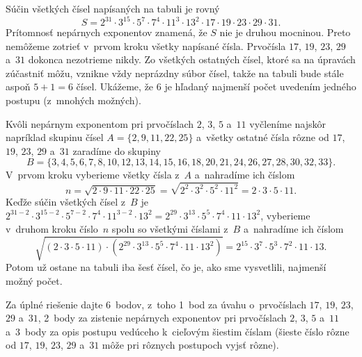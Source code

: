 {%
Súčin všetkých čísel napísaných na tabuli je rovný
$$
S=2^{31}\cdot3^{15}\cdot5^7\cdot7^4\cdot11^3
\cdot13^2\cdot17\cdot19\cdot23\cdot29\cdot31.
$$
Prítomnosť nepárnych exponentov znamená, že $S$ nie je druhou
mocninou. Preto nemôžeme zotrieť v~prvom kroku všetky napísané
čísla. Prvočísla $17$, $19$, $23$, $29$ a~$31$ dokonca nezotrieme nikdy.
Zo všetkých ostatných čísel, ktoré sa na úpravách zúčastniť môžu,
vznikne vždy neprázdny súbor čísel,
takže na tabuli bude stále aspoň $5+1=6$ čísel. Ukážeme, že 6 je
hľadaný najmenší počet uvedením jedného postupu (z~mnohých možných).

Kvôli nepárnym exponentom pri prvočíslach $2$, $3$, $5$ a~$11$ vyčleníme
najskôr napríklad skupinu čísel $A=\{2,9,11,22,25\}$
a~všetky ostatné čísla
rôzne od $17$, $19$, $23$, $29$ a~$31$ zaradíme do skupiny
$$
B=\{3,4,5,6,7,8,10,12,13,14,15,16,18,20,21,24,26,27,28,30,32,33\}.
$$
V~prvom kroku vyberieme všetky čísla z~$A$ a~nahradíme ich číslom
$$
n=\sqrt{2\cdot9\cdot11\cdot22\cdot25}=\sqrt{2^2\cdot3^2\cdot5^2
\cdot11^2}=2\cdot3\cdot5\cdot11.
$$
Keďže súčin všetkých čísel z~$B$ je $2^{31-2}\cdot3^{15-2}
\cdot5^{7-2}\cdot7^4\cdot11^{3-2}\cdot13^2=2^{29}\cdot3^{13}
\cdot5^{5}\cdot7^4\cdot11\cdot13^2$, vyberieme v~druhom kroku
číslo~$n$ spolu so všetkými číslami z~$B$ a~nahradíme ich číslom
$$
\sqrt{(2\cdot3\cdot5\cdot11)
\cdot(2^{29}\cdot3^{13}\cdot5^{5}\cdot7^4\cdot11\cdot13^2)}=
2^{15}\cdot3^7\cdot5^3\cdot7^2\cdot11\cdot13.
$$
Potom už ostane na tabuli iba šesť čísel, čo je, ako sme vysvetlili,
najmenší možný počet.

\nobreak\medskip\petit\noindent
Za úplné riešenie dajte 6~bodov, z~toho 1~bod za úvahu
o~prvočíslach $17$, $19$, $23$, $29$ a~$31$, 2~body za zistenie nepárnych
exponentov pri prvočíslach $2$, $3$, $5$ a~$11$ a~3~body za opis
postupu vedúceho k~cieľovým šiestim číslam (šieste číslo rôzne od
$17$, $19$, $23$, $29$ a~$31$ môže pri rôznych postupoch vyjsť rôzne).
\endpetit
}

